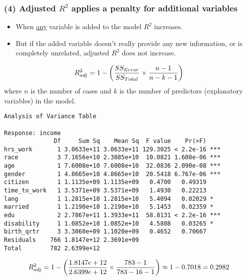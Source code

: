 \documentclass[11pt,containsverbatim,handout,xcolor=xelatex,dvipsnames,table]{beamer}
\begin{document}

\begin{frame}
\frametitle{(4) Adjusted $R^2$ applies a penalty for additional variables}

\begin{itemize}

\item When \underline{any} variable is added to the model $R^2$ increases.

\pause

\item But if the added variable doesn't really provide any new information, or is completely unrelated, adjusted $R^2$ does not increase.

\end{itemize}

\pause

{\[ R^2_{adj} = 1 - \left(  \frac{ SS_{Error} }{ SS_{Total} } \times \frac{n - 1}{n - k - 1}  \right) \]
where $n$ is the number of cases and $k$ is the number of predictors (explanatory variables) in the model.
}

\end{frame}


\begin{frame}[fragile]

{\tiny
\begin{Verbatim}[frame=single, formatcom=\color{gray}]
Analysis of Variance Table

Response: income
              Df     Sum Sq    Mean Sq  F value    Pr(>F)    
hrs_work       1 3.0633e+11 3.0633e+11 129.3025 < 2.2e-16 ***
race           3 7.1656e+10 2.3885e+10  10.0821 1.608e-06 ***
age            1 7.6008e+10 7.6008e+10  32.0836 2.090e-08 ***
gender         1 4.8665e+10 4.8665e+10  20.5418 6.767e-06 ***
citizen        1 1.1135e+09 1.1135e+09   0.4700   0.49319    
time_to_work   1 3.5371e+09 3.5371e+09   1.4930   0.22213    
lang           1 1.2815e+10 1.2815e+10   5.4094   0.02029 *  
married        1 1.2190e+10 1.2190e+10   5.1453   0.02359 *  
edu            2 2.7867e+11 1.3933e+11  58.8131 < 2.2e-16 ***
disability     1 1.0852e+10 1.0852e+10   4.5808   0.03265 *  
birth_qrtr     3 3.3060e+09 1.1020e+09   0.4652   0.70667    
Residuals    766 1.8147e+12 2.3691e+09          
Total        782 2.6399e+12             
\end{Verbatim}
}

\[ R^2_{adj} = 1 - \left(  \frac{1.8147e+12}{ 2.6399e+12 } \times \frac{783 - 1}{783 - 16 - 1}  \right) \approx 1 - 0.7018 = 0.2982 \]

\end{frame}
\end{document}
